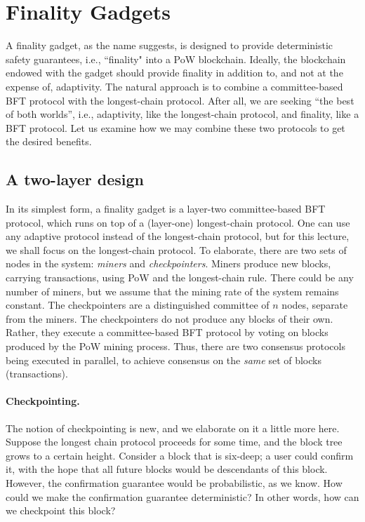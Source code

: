 \documentclass{article}
\begin{document}
\section*{Finality Gadgets}
A finality gadget, as the name suggests, is designed to provide deterministic safety guarantees, i.e.,  ``finality"  into a PoW blockchain. Ideally, the blockchain endowed with the gadget should provide finality in addition to, and not at the expense of, adaptivity. The natural approach is to combine a committee-based BFT protocol with the longest-chain protocol. After all, we are seeking ``the best of both worlds'', i.e., adaptivity, like the longest-chain protocol, and finality, like a BFT protocol. Let us examine how we may combine these two protocols to get the desired benefits.

\subsection*{A two-layer design}
In its simplest form, a finality gadget is a layer-two committee-based BFT protocol, which runs on top of a (layer-one) longest-chain protocol. One can use any adaptive protocol instead of the longest-chain protocol, but for this lecture, we shall focus on the longest-chain protocol. To elaborate, there are two sets of nodes in the system: \textit{miners} and \textit{checkpointers}. Miners produce new blocks, carrying transactions, using PoW and the longest-chain rule. There could be any number of miners, but we assume that the mining rate of the system remains constant. The checkpointers are a distinguished committee of $n$ nodes, separate from the miners. The checkpointers do not produce any blocks of their own. Rather, they execute a committee-based BFT protocol by voting on blocks produced by the PoW mining process. Thus, there are two consensus protocols being executed in parallel, to achieve consensus on the \textit{same} set of blocks (transactions).

\paragraph{Checkpointing.} The notion of checkpointing is new, and we elaborate on it a little more here. Suppose the longest chain protocol proceeds for some time, and the block tree grows to a certain height. Consider a block that is six-deep; a user could confirm it, with the hope that all future blocks would be descendants of this block. However, the confirmation guarantee would be probabilistic, as we know. How could we make the confirmation guarantee deterministic? In other words, how can we checkpoint this block? 
\end{document}
